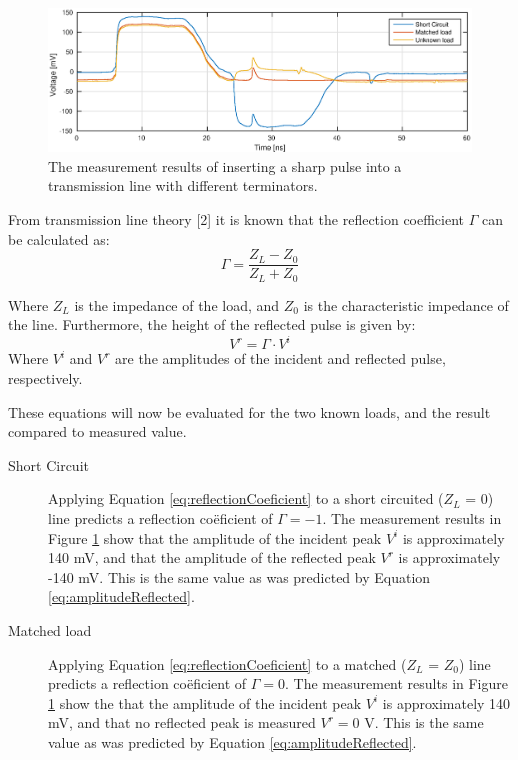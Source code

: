 \documentclass[11pt,a4paper]{article}
\begin{document}
\begin{figure}
\includegraphics[width=\textwidth]{assignment2aResults.eps}
\caption{The measurement results of inserting a sharp pulse into a transmission line with different terminators.}\label{fig:part2aResults}
\end{figure}

From transmission line theory [2] it is known that the reflection coefficient $\Gamma$ can be calculated as:
\begin{equation} \label{eq:reflectionCoeficient}
\Gamma = \frac{Z_L - Z_0}{Z_L + Z_0}
\end{equation}

Where $Z_L$ is the impedance of the load, and $Z_0$ is the characteristic impedance of the line. Furthermore, the height of the reflected pulse is given by:
\begin{equation}\label{eq:amplitudeReflected}
V^r = \Gamma \cdot V^i
\end{equation}
Where  $V^i$ and $V^r$ are the amplitudes of the incident and reflected pulse, respectively.

These equations will now be evaluated for the two known loads, and the result compared to measured value.

\begin{description}


\item[Short Circuit] Applying Equation \ref{eq:reflectionCoeficient} to a short circuited ($Z_L$ = 0) line predicts a reflection co\"eficient of $\Gamma = -1$.
The measurement results in Figure \ref {fig:part2aResults} show that the amplitude of the incident peak $V^i$ is approximately 140 mV, and that the amplitude of the reflected peak $V^r$ is approximately -140 mV. This is the same value as was predicted by Equation \ref{eq:amplitudeReflected}.

\item[Matched load] Applying Equation \ref{eq:reflectionCoeficient} to a matched ($Z_L$ = $Z_0$) line predicts a reflection co\"eficient of $\Gamma = 0$.
The measurement results in Figure \ref {fig:part2aResults} show the that the amplitude of the incident peak $V^i$ is approximately 140 mV, and that no reflected peak is measured $V^r = 0$ V. This is the same value as was predicted by Equation \ref{eq:amplitudeReflected}.
\end{description}
\end{document}
